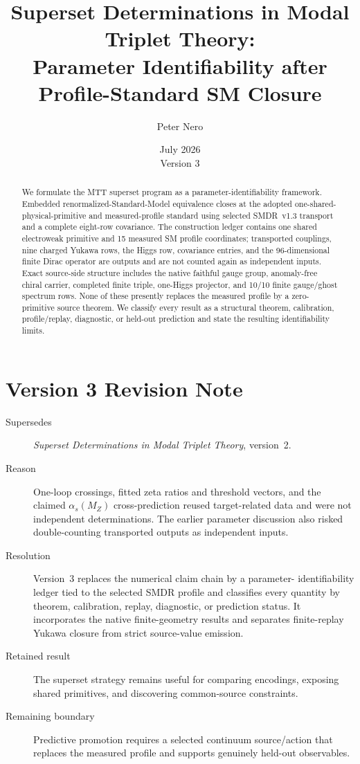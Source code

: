 \documentclass[11pt]{article}
\title{Superset Determinations in Modal Triplet Theory:\\Parameter Identifiability after Profile-Standard SM Closure}
\author{Peter Nero}
\date{July 2026\\Version 3}
\begin{document}
\maketitle

\begin{abstract}
We formulate the MTT superset program as a parameter-identifiability
framework. Embedded renormalized-Standard-Model equivalence closes at the
adopted one-shared-physical-primitive and measured-profile standard using
selected SMDR~v1.3 transport and a complete eight-row covariance. The
construction ledger contains one shared electroweak primitive and 15 measured
SM profile coordinates; transported couplings, nine charged Yukawa rows, the
Higgs row, covariance entries, and the 96-dimensional finite Dirac operator
are outputs and are not counted again as independent inputs. Exact source-side
structure includes the native faithful gauge group, anomaly-free chiral
carrier, completed finite triple, one-Higgs projector, and 10/10 finite
gauge/ghost spectrum rows. None of these presently replaces the measured
profile by a zero-primitive source theorem. We classify every result as a
structural theorem, calibration, profile/replay, diagnostic, or held-out
prediction and state the resulting identifiability limits.
\end{abstract}

\section*{Version 3 Revision Note}
\begin{description}
\item[Supersedes] \emph{Superset Determinations in Modal Triplet Theory},
version~2.
\item[Reason] One-loop crossings, fitted zeta ratios and threshold vectors,
and the claimed $\alpha_s(M_Z)$ cross-prediction reused target-related data and
were not independent determinations. The earlier parameter discussion also
risked double-counting transported outputs as independent inputs.
\item[Resolution] Version~3 replaces the numerical claim chain by a parameter-
identifiability ledger tied to the selected SMDR profile and classifies every
quantity by theorem, calibration, replay, diagnostic, or prediction status. It
incorporates the native finite-geometry results and separates finite-replay
Yukawa closure from strict source-value emission.
\item[Retained result] The superset strategy remains useful for comparing
encodings, exposing shared primitives, and discovering common-source
constraints.
\item[Remaining boundary] Predictive promotion requires a selected continuum
source/action that replaces the measured profile and supports genuinely
held-out observables.
\end{description}
\end{document}
